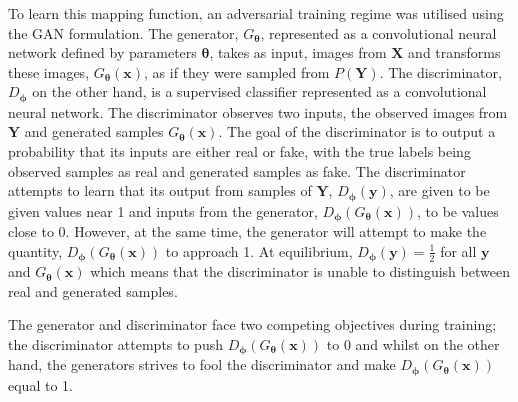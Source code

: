 To learn this mapping function, an adversarial training regime was utilised using the GAN formulation. The generator, $G_\mathbf{\theta}$, represented as a convolutional neural network defined by parameters $\mathbf{\theta}$, takes as input, images from $\mathbf{X}$ and transforms these images, $G_\mathbf{\theta}(\mathbf{x})$, as if they were sampled from $P(\mathbf{Y})$. The discriminator, $D_\mathbf{\phi}$ on the other hand, is a supervised classifier represented as a convolutional neural network. The discriminator observes two inputs, the observed images from $\mathbf{Y}$ and generated samples $G_\mathbf{\theta}(\mathbf{x})$. The goal of the discriminator is to output a probability that its inputs are either real or fake, with the true labels being observed samples as real and generated samples as fake. The discriminator attempts to learn that its output from samples of $\mathbf{Y}$,  $D_\mathbf{\phi}(\mathbf{y})$, are given to be given values near 1 and inputs from the generator, $D_\mathbf{\phi}(G_\mathbf{\theta}(\mathbf{x}))$, to be values close to 0. However, at the same time, the generator will attempt to make the quantity, $D_\mathbf{\phi}(G_\mathbf{\theta}(\mathbf{x}))$ to approach 1. At equilibrium, $D_\mathbf{\phi}(\mathbf{y})=\frac{1}{2}$ for all $\mathbf{y}$ and $G_\mathbf{\theta}(\mathbf{x})$ which means that the discriminator is unable to distinguish between real and generated samples.

The generator and discriminator face two competing objectives during training; the discriminator attempts to push $D_\mathbf{\phi}(G_\mathbf{\theta}(\mathbf{x}))$ to 0 and whilst on the other hand, the generators strives to fool the discriminator and make $D_\mathbf{\phi}(G_\mathbf{\theta}(\mathbf{x}))$ equal to 1.


